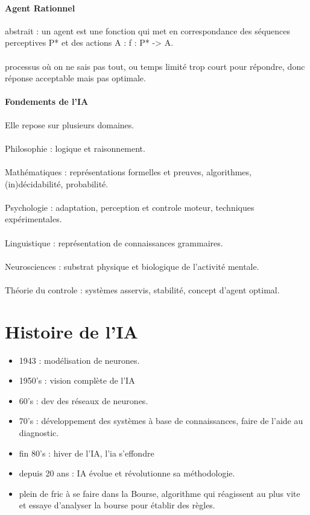 \documentclass{article}
\begin{document}
\paragraph{Agent Rationnel} abstrait : un agent est une fonction qui met en correspondance des séquences perceptives P* et des actions A : f : P* -> A.\\\\processus où on ne sais pas tout, ou temps limité trop court pour répondre, donc réponse acceptable mais pas optimale.
\paragraph{Fondements de l'IA}Elle repose sur plusieurs domaines.\\\\Philosophie : logique et raisonnement.\\\\Mathématiques : représentations formelles et preuves, algorithmes, (in)décidabilité, probabilité.\\\\Psychologie : adaptation, perception et controle moteur, techniques expérimentales.\\\\Linguistique : représentation de connaissances grammaires.\\\\Neurosciences : substrat physique et biologique de l'activité mentale.\\\\Théorie du controle : systèmes asservis, stabilité, concept d'agent optimal.

\section{Histoire de l'IA}
\begin{itemize}
\item 1943 : modélisation de neurones.
\item 1950's : vision complète de l'IA
\item 60's : dev des réseaux de neurones.
\item 70's : développement des systèmes à base de connaissances, faire de l'aide au diagnostic.
\item fin 80's : hiver de l'IA, l'ia s’effondre
\item depuis 20 ans : IA évolue et révolutionne sa méthodologie.
\item plein de fric à se faire dans la Bourse, algorithme qui réagissent au plus vite et essaye d'analyser la bourse pour établir des règles. 
\end{itemize}
\end{document}
